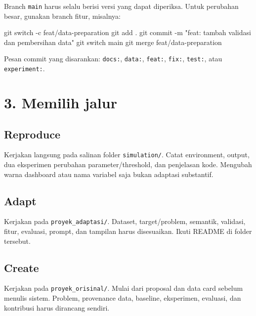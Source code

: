 \documentclass[
  indonesian,
  letterpaper,
  DIV=11,
  numbers=noendperiod]{scrreprt}
\newenvironment{Shaded}{\begin{snugshade}}{\end{snugshade}}
\newcommand{\AttributeTok}[1]{\textcolor[rgb]{0.40,0.45,0.13}{#1}}
\newcommand{\FunctionTok}[1]{\textcolor[rgb]{0.28,0.35,0.67}{#1}}
\newcommand{\NormalTok}[1]{\textcolor[rgb]{0.00,0.23,0.31}{#1}}
\newcommand{\StringTok}[1]{\textcolor[rgb]{0.13,0.47,0.30}{#1}}
\begin{document}
Branch \texttt{main} harus selalu berisi versi yang dapat diperiksa.
Untuk perubahan besar, gunakan branch fitur, misalnya:

\begin{Shaded}
\begin{Highlighting}[]
\FunctionTok{git}\NormalTok{ switch }\AttributeTok{{-}c}\NormalTok{ feat/data{-}preparation}
\FunctionTok{git}\NormalTok{ add .}
\FunctionTok{git}\NormalTok{ commit }\AttributeTok{{-}m} \StringTok{"feat: tambah validasi dan pembersihan data"}
\FunctionTok{git}\NormalTok{ switch main}
\FunctionTok{git}\NormalTok{ merge feat/data{-}preparation}
\end{Highlighting}
\end{Shaded}

Pesan commit yang disarankan: \texttt{docs:}, \texttt{data:},
\texttt{feat:}, \texttt{fix:}, \texttt{test:}, atau
\texttt{experiment:}.

\section{3. Memilih jalur}\label{memilih-jalur}

\subsection{Reproduce}\label{reproduce}

Kerjakan langsung pada salinan folder \texttt{simulation/}. Catat
environment, output, dua eksperimen perubahan parameter/threshold, dan
penjelasan kode. Mengubah warna dashboard atau nama variabel saja bukan
adaptasi substantif.

\subsection{Adapt}\label{adapt}

Kerjakan pada \texttt{proyek\_adaptasi/}. Dataset, target/problem,
semantik, validasi, fitur, evaluasi, prompt, dan tampilan harus
disesuaikan. Ikuti README di folder tersebut.

\subsection{Create}\label{create}

Kerjakan pada \texttt{proyek\_orisinal/}. Mulai dari proposal dan data
card sebelum menulis sistem. Problem, provenance data, baseline,
eksperimen, evaluasi, dan kontribusi harus dirancang sendiri.
\end{document}

